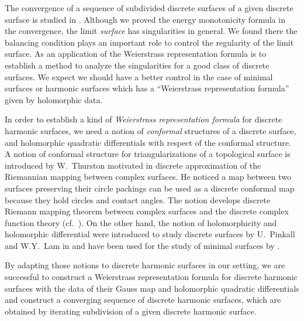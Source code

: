 \documentclass[10pt,a4paper]{amsart}
\newcommand{\1}{{\bf 1}}
\numberwithin{equation}{section}
\begin{document}
The convergence of a sequence of subdivided discrete surfaces of a given discrete surface is studied in \cite{kotani-naito-tao, tao}.
Although we proved the energy monotonicity formula in the convergence,
the limit {\em surface} has singularities in general.
We found there the balancing condition plays an important role to control the regularity of the limit surface.
As an application of the Weierstrass representation formula is to establish a method to analyze the singularities for a good class of discrete surfaces.
We expect we should have a better control in the case of minimal surfaces or harmonic surfaces which has a ``Weierstrass representation formula'' given by holomorphic data.

In order to establish a kind of {\em Weierstrass representation formula} for discrete harmonic surfaces,
we need a notion of {\em conformal} structures of a discrete surface,
and holomorphic quadratic differentials with respect of the conformal structure.
A notion of conformal structure for triangularizations of a topological surface is introduced by
W.~Thurston \cite{thurston} motivated in discrete approximation of the Riemannian mapping between complex surfaces.
He noticed a map between two surfaces preserving their circle packings can be used as a discrete conformal map
because they hold circles and contact angles.
The notion develops discrete Riemann mapping theorem \cite{rodin-sullivan} between complex surfaces
and the discrete complex function theory (cf.\ \cite{circle-packing}).
On the other hand, the notion of holomorphicity and holomorphic differential were introduced to study discrete surfaces
by U.~Pinkall and W.Y.~Lam in \cite{lam-pinkall} and have been used for the study of minimal surfaces by \cite{lam, lam2}.

By adapting those notions to discrete harmonic surfaces in our setting,
we are successful to construct a Weierstrass representation formula for discrete harmonic surfaces with the data of their Gauss map and holomorphic quadratic differentials and construct a converging sequence of discrete harmonic surfaces, which are obtained by iterating subdivision of a given discrete harmonic surface.
\end{document}
